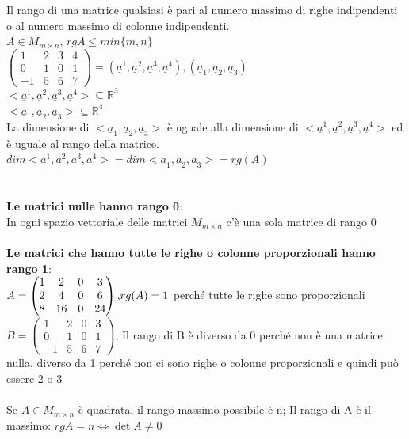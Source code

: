 Il rango di una matrice qualsiasi è pari al numero massimo di righe
indipendenti o al numero massimo di colonne indipendenti.\\
$A\in M_{m\times n}$, $rgA\leqslant min\{m,n\}$\\
$
\begin{pmatrix}
  1 & 2 & 3 & 4\\
  0 & 1 & 0 & 1\\
  -1 & 5 & 6 & 7
\end{pmatrix}=(\underline{a}^1, \underline{a}^2, \underline{a}^3,
\underline{a}^4), (\underline{a}_1,\underline{a}_2,\underline{a}_3)$\\
$<\underline{a}^1, \underline{a}^2, \underline{a}^3,
\underline{a}^4>\subseteq\mathbb{R}^3$\\
$<\underline{a}_1,\underline{a}_2,\underline{a}_3>\subseteq\mathbb{R}^4$\\
La dimensione di $<\underline{a}_1,\underline{a}_2,\underline{a}_3>$
è uguale alla dimensione di $<\underline{a}^1, \underline{a}^2,
\underline{a}^3, \underline{a}^4>$ ed è uguale al rango della matrice.\\
$dim<\underline{a}^1, \underline{a}^2, \underline{a}^3,
\underline{a}^4>=dim<\underline{a}_1,\underline{a}_2,\underline{a}_3>=rg(A)$\\\\\\
\textbf{Le matrici nulle hanno rango 0}:\\
In ogni spazio vettoriale delle matrici $M_{m\times n}$ c'è una sola
matrice di rango 0\\\\
\textbf{Le matrici che hanno tutte le righe o colonne proporzionali
hanno rango 1}:\\
$A=
\begin{pmatrix}
  1 & 2 & 0 & 3\\
  2 & 4 & 0 & 6\\
  8 & 16 & 0 & 24
\end{pmatrix}\textnormal{,} rg(A)=1$ perché tutte le righe sono proporzionali\\
$B=
\begin{pmatrix}
  1 & 2 & 0 & 3\\
  0 & 1 & 0 & 1\\
  -1 & 5 & 6 & 7
\end{pmatrix}$, Il rango di B è diverso da 0 perché non è una matrice
nulla, diverso da 1 perché non ci sono righe o colonne proporzionali
e quindi può essere 2 o 3\\\\
Se $A\in M_{m\times n}$ è quadrata, il rango massimo possibile è n;
Il rango di A è il massimo: $rgA=n\Leftrightarrow \det A\neq 0$
\newpage
